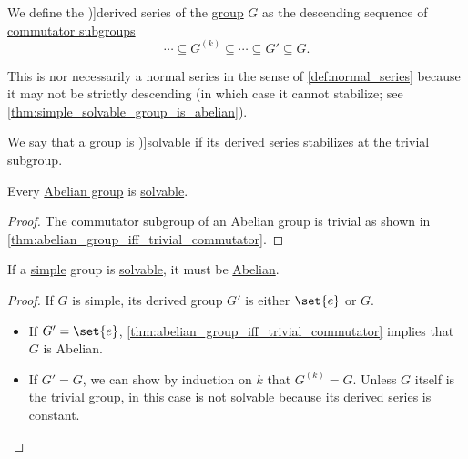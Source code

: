 \begin{definition}\label{def:derived_group_series}
  We define the \term[ru=производный ряд (\cite[48]{Кострикин2020АлгебраЧасть3})]{derived series} of the \hyperref[def:group]{group} \( G \) as the descending sequence of \hyperref[def:group_commutator]{commutator subgroups}
  \begin{equation*}
    \cdots \subseteq G^{(k)} \subseteq \cdots \subseteq G' \subseteq G.
  \end{equation*}
\end{definition}
\begin{comments}
  \item This is nor necessarily a normal series in the sense of \cref{def:normal_series} because it may not be strictly descending (in which case it cannot stabilize; see \cref{thm:simple_solvable_group_is_abelian}).
\end{comments}

\begin{definition}\label{def:solvable_group}
  We say that a group is \term[ru=разрешимая (группа) (\cite[48]{Кострикин2020АлгебраЧасть3})]{solvable} if its \hyperref[def:derived_group_series]{derived series} \hyperref[def:stabilizing_sequence]{stabilizes} at the trivial subgroup.
\end{definition}

\begin{proposition}\label{thm:abelian_group_is_solvable}
  Every \hyperref[def:abelian_group]{Abelian group} is \hyperref[def:solvable_group]{solvable}.
\end{proposition}
\begin{proof}
  The commutator subgroup of an Abelian group is trivial as shown in \cref{thm:abelian_group_iff_trivial_commutator}.
\end{proof}

\begin{proposition}\label{thm:simple_solvable_group_is_abelian}
  If a \hyperref[def:simple_group]{simple} group is \hyperref[def:solvable_group]{solvable}, it must be \hyperref[def:abelian_group]{Abelian}.
\end{proposition}
\begin{proof}
  If \( G \) is simple, its derived group \( G' \) is either \( \set{ e } \) or \( G \).
  \begin{itemize}
    \item If \( G' = \set{ e } \), \cref{thm:abelian_group_iff_trivial_commutator} implies that \( G \) is Abelian.
    \item If \( G' = G \), we can show by induction on \( k \) that \( G^{(k)} = G \). Unless \( G \) itself is the trivial group, in this case is not solvable because its derived series is constant.
  \end{itemize}
\end{proof}

